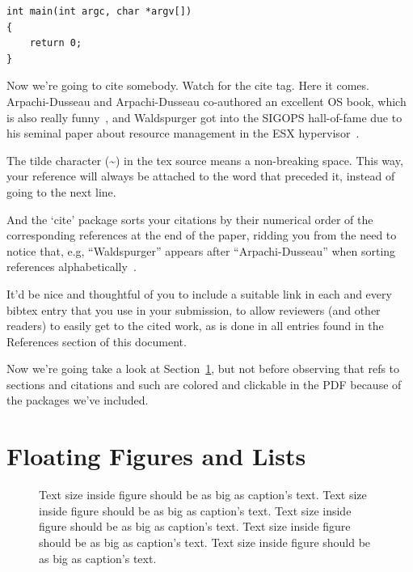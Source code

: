 \documentclass[a4paper,10pt,titlepage]{ctexart}
\begin{document}
\begin{verbatim}
int main(int argc, char *argv[]) 
{
    return 0;
}
\end{verbatim}

Now we're going to cite somebody. Watch for the cite tag. Here it
comes. Arpachi-Dusseau and Arpachi-Dusseau co-authored an excellent OS
book, which is also really funny~\cite{arpachiDusseau18:osbook}, and
Waldspurger got into the SIGOPS hall-of-fame due to his seminal paper
about resource management in the ESX hypervisor~\cite{waldspurger02}.

The tilde character (\~{}) in the tex source means a non-breaking
space. This way, your reference will always be attached to the word
that preceded it, instead of going to the next line.

And the `cite' package sorts your citations by their numerical order
of the corresponding references at the end of the paper, ridding you
from the need to notice that, e.g, ``Waldspurger'' appears after
``Arpachi-Dusseau'' when sorting references
alphabetically~\cite{waldspurger02,arpachiDusseau18:osbook}. 

It'd be nice and thoughtful of you to include a suitable link in each
and every bibtex entry that you use in your submission, to allow
reviewers (and other readers) to easily get to the cited work, as is
done in all entries found in the References section of this document.

Now we're going take a look at Section~\ref{sec:figs}, but not before
observing that refs to sections and citations and such are colored and
clickable in the PDF because of the packages we've included.

\section{Floating Figures and Lists}
\label{sec:figs}


\begin{figure}
\begin{center}
\end{center}
\caption{\label{fig:vectors} Text size inside figure should be as big as
  caption's text. Text size inside figure should be as big as
  caption's text. Text size inside figure should be as big as
  caption's text. Text size inside figure should be as big as
  caption's text. Text size inside figure should be as big as
  caption's text. }
\end{figure}
\end{document}

